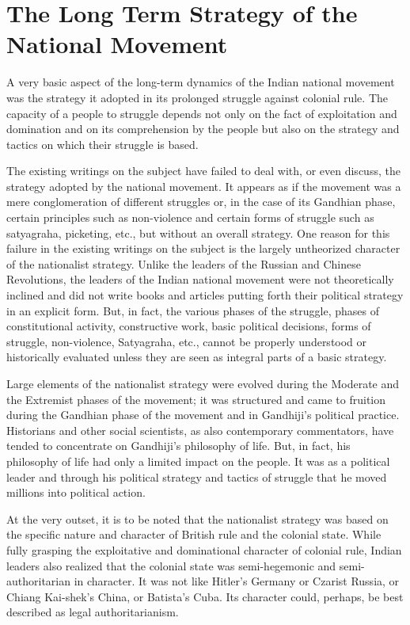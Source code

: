 \chapter{The Long Term Strategy of the National Movement}\label{chapter:CH38}
\begin{multicols}{2}

A very basic aspect of the long-term dynamics of the Indian national movement was the strategy it adopted in its prolonged struggle against colonial rule. The capacity of a people to struggle depends not only on the fact of exploitation and domination and on its comprehension by the people but also on the strategy and tactics on which their struggle is based.

The existing writings on the subject have failed to deal with, or even discuss, the strategy adopted by the national movement. It appears as if the movement was a mere conglomeration of different struggles or, in the case of its Gandhian phase, certain principles such as non-violence and certain forms of struggle such as satyagraha, picketing, etc., but without an overall strategy. One reason for this failure in the existing writings on the subject is the largely untheorized character of the nationalist strategy. Unlike the leaders of the Russian and Chinese Revolutions, the leaders of the Indian national movement were not theoretically inclined and did not write books and articles putting forth their political strategy in an explicit form. But, in fact, the various phases of the struggle, phases of constitutional activity, constructive work, basic political decisions, forms of struggle, non-violence, Satyagraha, etc., cannot be properly understood or historically evaluated unless they are seen as integral parts of a basic strategy.

Large elements of the nationalist strategy were evolved during the Moderate and the Extremist phases of the movement; it was structured and came to fruition during the Gandhian phase of the movement and in Gandhiji's political practice. Historians and other social scientists, as also contemporary commentators, have tended to concentrate on Gandhiji's philosophy of life. But, in fact, his philosophy of life had only a limited impact on the people. It was as a political leader and through his political strategy and tactics of struggle that he moved millions into political action.

At the very outset, it is to be noted that the nationalist strategy was based on the specific nature and character of British rule and the colonial state. While fully grasping the exploitative and dominational character of colonial rule, Indian leaders also realized that the colonial state was semi-hegemonic and semi- authoritarian in character. It was not like Hitler's Germany or Czarist Russia, or Chiang Kai-shek's China, or Batista's Cuba. Its character could, perhaps, be best described as legal authoritarianism.


\end{multicols}
